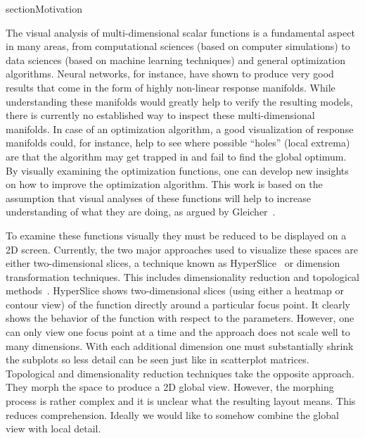 section{Motivation}\label{motivation}

The visual analysis of multi-dimensional scalar functions is a fundamental aspect in many areas, from computational sciences (based on computer simulations) to data sciences (based on machine learning techniques) and general optimization algorithms. 
Neural networks, for instance, have shown to produce very good results that come in the form of highly non-linear response manifolds.
While understanding these manifolds would greatly help to verify
the resulting models, there
is currently no established way to inspect these multi-dimensional manifolds. %
In case of an optimization algorithm, a good visualization of response manifolds could, for instance, help to see where possible
``holes'' (local extrema) are that the algorithm may get trapped in and fail to find the
global optimum. By visually examining the optimization functions,
one can develop new insights on how to improve the optimization
algorithm. This work is based on the assumption that visual analyses of these functions will help to increase
understanding of what they are doing, 
as argued by Gleicher~\cite{Gleicher:2016}.

To examine these functions visually they must be reduced to be
displayed on a 2D screen. 
Currently, the two major approaches used to visualize these spaces are either
two-dimensional slices, a technique known as HyperSlice~\cite{Wijk:1993} or dimension transformation techniques. This includes dimensionality
reduction and topological methods~\cite{Correa:2011,Carr:2003a}.  HyperSlice
shows two-dimensional slices (using either a heatmap or contour view)
of the function directly around a particular focus point. It clearly shows the
behavior of the function with respect to the parameters. However, one can only
view one focus point at a time and 
the approach does not scale well to many dimensions.
With each additional dimension one must substantially 
shrink the subplots so less detail can be seen just like in scatterplot matrices. Topological and dimensionality
reduction techniques take the opposite approach. They morph the space to
produce a 2D global view. However, the morphing process is rather
complex and it is unclear what the resulting layout means. This reduces
comprehension. Ideally we would like to somehow combine the global view with
local detail.

